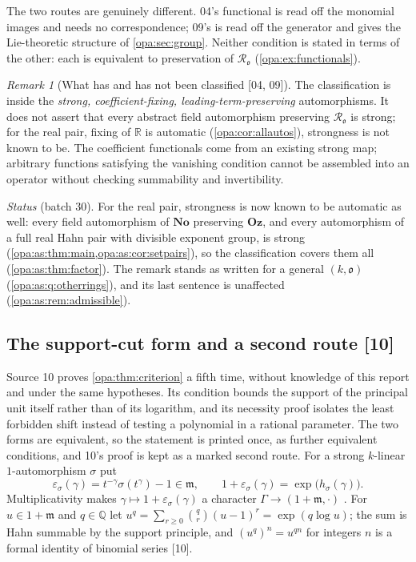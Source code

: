 \documentclass[11pt,oneside]{article}
\numberwithin{equation}{section}
\theoremstyle{definition}
\theoremstyle{remark}
\newtheorem{remark}[remark]{Remark}
\newcommand{\No}{\mathbf{No}}
\newcommand{\Oz}{\mathbf{Oz}}
\newcommand{\R}{\mathbb R}
\newcommand{\Q}{\mathbb Q}
\newcommand{\oo}{\mathfrak o}
\newcommand{\Ro}{\mathcal R_{\oo}}
\newcommand{\mm}{\mathfrak m}
\newcommand{\src}[1]{\textup{\textsf{\small[#1]}}}
\begin{document}
The two routes are genuinely different. 04's functional is read off the
monomial images and needs no correspondence; 09's is read off the generator
and gives the Lie-theoretic structure of \cref{opa:sec:group}. Neither
condition is stated in terms of the other: each is equivalent to preservation
of $\Ro$ (\cref{opa:ex:functionals}).

\begin{remark}[What has and has not been classified \src{04, 09}]\label{opa:rem:classified}
The classification is inside the \emph{strong, coefficient-fixing,
leading-term-preserving} automorphisms. It does not assert that every abstract
field automorphism preserving $\Ro$ is strong; for the real pair, fixing of
$\R$ is automatic (\cref{opa:cor:allautos}), strongness is not known to be. The
coefficient functionals come from an existing strong map; arbitrary functions
satisfying the vanishing condition cannot be assembled into an operator
without checking summability and invertibility.
\end{remark}

\emph{Status} (batch 30). For the real pair, strongness is now known to be
automatic as well: every field automorphism of $\No$ preserving $\Oz$, and every
automorphism of a full real Hahn pair with divisible exponent group, is strong
(\cref{opa:as:thm:main,opa:as:cor:setpairs}), so the classification covers them
all (\cref{opa:as:thm:factor}). The remark stands as written for a general
$(k,\oo)$ (\cref{opa:as:q:otherrings}), and its last sentence is unaffected
(\cref{opa:as:rem:admissible}).

\subsection{The support-cut form and a second route \src{10}}\label{opa:sc:sub:supportcut}

Source 10 proves \cref{opa:thm:criterion} a fifth time, without knowledge of
this report and under the same hypotheses. Its condition bounds the support
of the principal unit itself rather than of its logarithm, and its necessity
proof isolates the least forbidden shift instead of testing a polynomial in
a rational parameter. The two forms are equivalent, so the statement is
printed once, as further equivalent conditions, and 10's proof is kept as a
marked second route. For a strong $k$-linear $1$-automorphism $\sigma$ put
\begin{equation}\label{opa:sc:eq:unit}
 \varepsilon_\sigma(\gamma)=t^{-\gamma}\sigma(t^\gamma)-1\in\mm,\qquad
 1+\varepsilon_\sigma(\gamma)=\exp\bigl(h_\sigma(\gamma)\bigr).
\end{equation}
Multiplicativity makes $\gamma\mapsto1+\varepsilon_\sigma(\gamma)$ a character
$\Gamma\to(1+\mm,\cdot)$ \cite{KS}. For $u\in1+\mm$ and $q\in\Q$ let
$u^q=\sum_{r\ge0}\binom qr(u-1)^r=\exp(q\log u)$; the sum is Hahn summable by
the support principle, and $(u^q)^n=u^{qn}$ for integers $n$ is a formal
identity of binomial series \src{10}.
\end{document}
